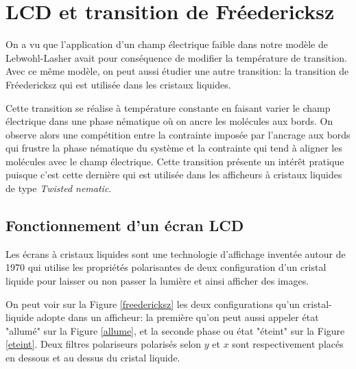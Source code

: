 \documentclass[11pt,a4paper]{article}
\numberwithin{equation}{section}
\begin{document}
\section{LCD et transition de Fréedericksz}
\label{lcd_partie}




On a vu que l'application d'un champ électrique faible dans notre modèle de Lebwohl-Lasher avait pour conséquence de modifier la température de transition. Avec ce même modèle, on peut aussi étudier une autre transition: la transition de Fréedericksz qui est utilisée dans les cristaux liquides. 
\medskip

Cette transition se réalise à température constante en faisant varier le champ électrique dans une phase nématique où on ancre les molécules aux bords. On observe alors une compétition entre la contrainte imposée par l'ancrage aux bords qui frustre la phase nématique du système et la contrainte qui tend à aligner les molécules avec le champ électrique. Cette transition présente un intérêt pratique puisque c'est cette dernière qui est utilisée dans les afficheurs à cristaux liquides de type \textit{Twisted nematic}.

\subsection{Fonctionnement d'un écran LCD}

Les écrans à cristaux liquides sont une technologie d'affichage inventée autour de 1970 qui utilise les propriétés polarisantes de deux configuration d'un cristal liquide pour laisser ou non passer la lumière et ainsi afficher des images. 
\medskip

On peut voir sur la Figure \ref{freedericksz} les deux configurations qu'un cristal-liquide adopte dans un afficheur: la première qu'on peut aussi appeler état "allumé" sur la Figure \ref{allume}, et la seconde phase ou état "éteint" sur la Figure \ref{eteint}. Deux filtres polariseurs polarisés selon $y$ et $x$ sont respectivement placés en dessous et au dessus du cristal liquide.
\end{document}
